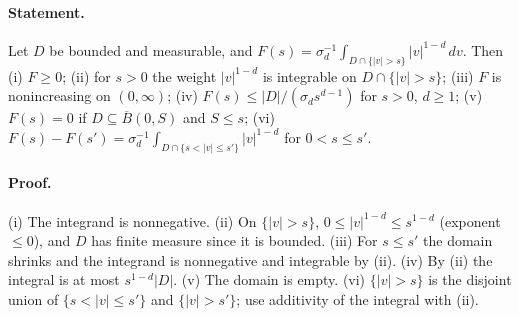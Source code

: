 \paragraph{Statement.} Let $D$ be bounded and measurable, and
$F(s)=\sigma_d^{-1}\int_{D\cap\{|v|>s\}}|v|^{1-d}\,dv$. Then
(i) $F\ge0$;
(ii) for $s>0$ the weight $|v|^{1-d}$ is integrable on $D\cap\{|v|>s\}$;
(iii) $F$ is nonincreasing on $(0,\infty)$;
(iv) $F(s)\le|D|/(\sigma_d s^{d-1})$ for $s>0$, $d\ge1$;
(v) $F(s)=0$ if $D\subseteq\overline B(0,S)$ and $S\le s$;
(vi) $F(s)-F(s')=\sigma_d^{-1}\int_{D\cap\{s<|v|\le s'\}}|v|^{1-d}$ for $0<s\le s'$.
\paragraph{Proof.} (i) The integrand is nonnegative. (ii) On $\{|v|>s\}$,
$0\le|v|^{1-d}\le s^{1-d}$ (exponent $\le0$), and $D$ has finite measure since it is bounded.
(iii) For $s\le s'$ the domain shrinks and the integrand is nonnegative and integrable by (ii).
(iv) By (ii) the integral is at most $s^{1-d}|D|$. (v) The domain is empty.
(vi) $\{|v|>s\}$ is the disjoint union of $\{s<|v|\le s'\}$ and $\{|v|>s'\}$; use additivity of
the integral with (ii).
